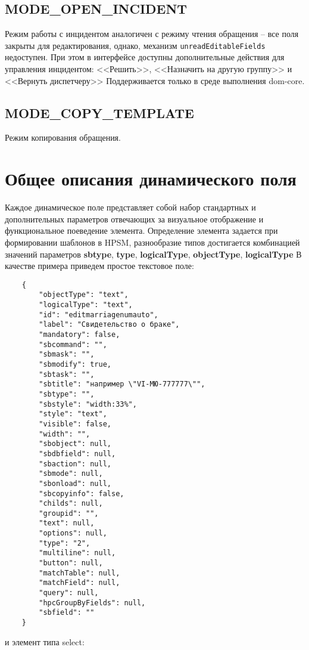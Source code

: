 \documentclass[../index.tex]{subfiles}
\begin{document}
\subsection{MODE\_OPEN\_INCIDENT}
Режим работы с инцидентом аналогичен с режиму чтения обращения -- все поля закрыты для редактирования, однако, механизм \verb|unreadEditableFields| недоступен. При этом в интерфейсе доступны дополнительные действия для управления инцидентом: <<Решить>>,  <<Назначить на другую группу>> и <<Вернуть диспетчеру>>
Поддерживается только в среде выполнения dom-core.

\subsection{MODE\_COPY\_TEMPLATE}
Режим копирования обращения.
\section{Общее описания динамического поля}
	Каждое динамическое поле представляет собой набор стандартных и дополнительных параметров отвечающих за визуальное отображение и функциональное поеведение элемента.
	Определение элемента задается при формировании шаблонов в HPSM, разнообразие типов достигается комбинацией значений параметров \textbf{sbtype}, \textbf{type}, \textbf{logicalType}, \textbf{objectType}, \textbf{logicalType}
	В качестве примера приведем простое текстовое поле:
\begin{verbatim}
	{
		"objectType": "text",
		"logicalType": "text",
		"id": "editmarriagenumauto",
		"label": "Свидетельство о браке",
		"mandatory": false,
		"sbcommand": "",
		"sbmask": "",
		"sbmodify": true,
		"sbtask": "",
		"sbtitle": "например \"VI-МЮ-777777\"",
		"sbtype": "",
		"sbstyle": "width:33%",
		"style": "text",
		"visible": false,
		"width": "",
		"sbobject": null,
		"sbdbfield": null,
		"sbaction": null,
		"sbmode": null,
		"sbonload": null,
		"sbcopyinfo": false,
		"childs": null,
		"groupid": "",
		"text": null,
		"options": null,
		"type": "2",
		"multiline": null,
		"button": null,
		"matchTable": null,
		"matchField": null,
		"query": null,
		"hpcGroupByFields": null,
		"sbfield": ""
	}
\end{verbatim}
	и элемент типа select:
\end{document}
